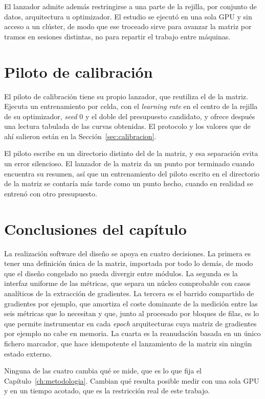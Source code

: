 El lanzador admite además restringirse a una parte de la rejilla, por conjunto de datos, arquitectura u optimizador. El estudio se ejecutó en una sola GPU y sin acceso a un clúster, de modo que ese troceado sirve para avanzar la matriz por tramos en sesiones distintas, no para repartir el trabajo entre máquinas.

\section{Piloto de calibración}
\label{sec:pilot}

El piloto de calibración tiene su propio lanzador, que reutiliza el de la matriz. Ejecuta un entrenamiento por celda, con el \emph{learning rate} en el centro de la rejilla de su optimizador, \emph{seed} 0 y el doble del presupuesto candidato, y ofrece después una lectura tabulada de las curvas obtenidas. El protocolo y los valores que de ahí salieron están en la Sección~\ref{sec:calibracion}.

El piloto escribe en un directorio distinto del de la matriz, y esa separación evita un error silencioso. El lanzador de la matriz da un punto por terminado cuando encuentra su resumen, así que un entrenamiento del piloto escrito en el directorio de la matriz se contaría más tarde como un punto hecho, cuando en realidad se entrenó con otro presupuesto.

\section{Conclusiones del capítulo}
\label{sec:impl-conclusiones}

La realización software del diseño se apoya en cuatro decisiones. La primera es tener una definición única de la matriz, importada por todo lo demás, de modo que el diseño congelado no pueda divergir entre módulos. La segunda es la interfaz uniforme de las métricas, que separa un núcleo comprobable con casos analíticos de la extracción de gradientes. La tercera es el barrido compartido de gradientes por ejemplo, que amortiza el coste dominante de la medición entre las seis métricas que lo necesitan y que, junto al procesado por bloques de filas, es lo que permite instrumentar en cada \emph{epoch} arquitecturas cuya matriz de gradientes por ejemplo no cabe en memoria. La cuarta es la reanudación basada en un único fichero marcador, que hace idempotente el lanzamiento de la matriz sin ningún estado externo.

Ninguna de las cuatro cambia qué se mide, que es lo que fija el Capítulo~\ref{ch:metodologia}. Cambian qué resulta posible medir con una sola GPU y en un tiempo acotado, que es la restricción real de este trabajo.
